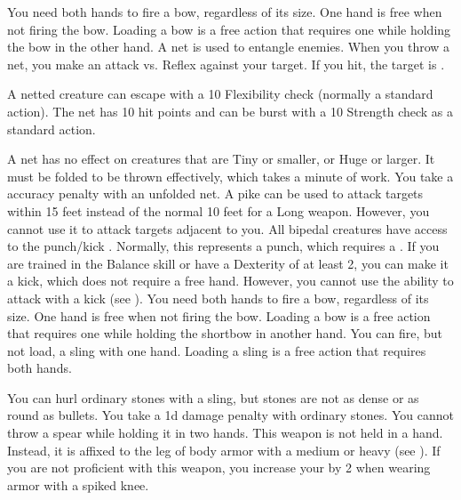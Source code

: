          You need both hands to fire a bow, regardless of its size. One hand is free when not firing the bow. Loading a bow is a free action that requires one  while holding the bow in the other hand.
         A net is used to entangle enemies. When you throw a net, you make an attack vs. Reflex against your target. If you hit, the target is \slowed.
        \par A netted creature can escape with a  10 Flexibility check (normally a standard action). The net has 10 hit points and can be burst with a  10 Strength check as a standard action.
        \par A net has no effect on creatures that are Tiny or smaller, or Huge or larger. It must be folded to be thrown effectively, which takes a minute of work. You take a  accuracy penalty with an unfolded net.
         A pike can be used to attack targets within 15 feet instead of the normal 10 feet for a Long weapon.
        However, you cannot use it to attack targets adjacent to you.
         All bipedal creatures have access to the punch/kick .
        Normally, this represents a punch, which requires a .
        If you are trained in the Balance skill or have a Dexterity of at least 2, you can make it a kick, which does not require a free hand.
        However, you cannot use the  ability to attack with a kick (see ).
         You need both hands to fire a bow, regardless of its size. One hand is free when not firing the bow. Loading a bow is a free action that requires one  while holding the shortbow in another hand.
         You can fire, but not load, a sling with one hand. Loading a sling is a free action that requires both hands.
        \par You can hurl ordinary stones with a sling, but stones are not as dense or as round as bullets. You take a \minus1d damage penalty with ordinary stones.
         You cannot throw a spear while holding it in two hands.
         This weapon is not held in a hand.
        Instead, it is affixed to the leg of body armor with a medium or heavy  (see ).
        If you are not proficient with this weapon, you increase your  by 2 when wearing armor with a spiked knee.
